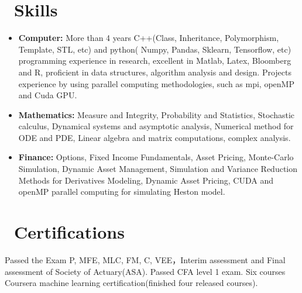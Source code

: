 \documentclass{resume}
\begin{document}
\section{\faWrench
\ Skills}
\begin{itemize}[parsep=0.5ex]\large
  \item \textbf{Computer:} More than 4 years C++(Class,  Inheritance,  Polymorphism,  Template,  STL,  etc) and python( Numpy,  Pandas, 
  Sklearn,  Tensorflow,  etc) programming experience in research,   excellent in Matlab,  Latex,  Bloomberg and R,  proficient in data structures,  algorithm analysis and design. Projects experience by using parallel computing methodologies,  such as mpi, openMP and Cuda GPU.
  
  \item \textbf{Mathematics:}
   Measure and Integrity,  Probability and Statistics,  Stochastic calculus,  Dynamical systems and asymptotic analysis, 
  Numerical method for ODE and PDE,  Linear algebra and matrix computations,  complex analysis.
  
  \item \textbf{Finance:} Options,  Fixed Income Fundamentals,  Asset Pricing,  Monte-Carlo Simulation,  Dynamic Asset Management, 
  Simulation and Variance Reduction Methods for Derivatives Modeling,  Dynamic Asset Pricing,  CUDA and openMP parallel computing for simulating Heston model.
  
\end{itemize}

\section{\faBook\ Certifications}\large 
Passed the Exam P,  MFE,  MLC,  FM,  C,  VEE，Interim assessment and Final assessment of Society of Actuary(ASA). Passed CFA level 1 exam. Six courses Coursera machine learning certification(finished four released courses).

%
%
\end{document}
